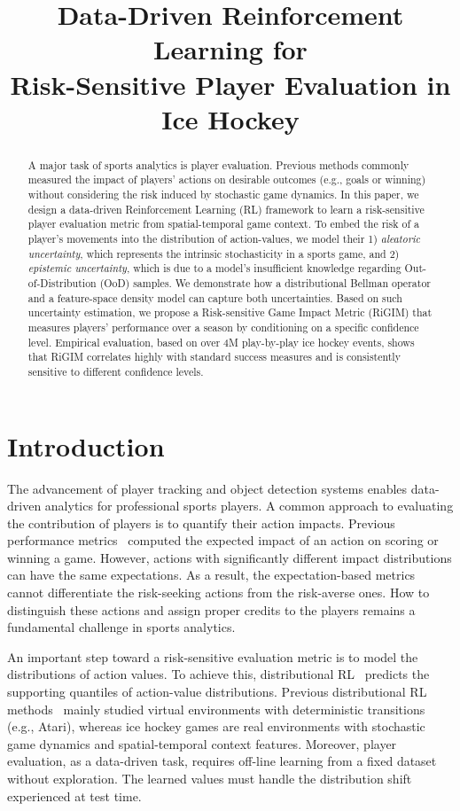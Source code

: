 \documentclass{article}
\title{Data-Driven Reinforcement Learning for \\Risk-Sensitive Player Evaluation in Ice Hockey}
\author{
}
\begin{document}
\maketitle

\begin{abstract}
A major task of sports analytics is player evaluation. Previous methods commonly measured the impact of players' actions on desirable outcomes (e.g., goals or winning) without considering the risk induced by stochastic game dynamics.  In this paper, we design a data-driven Reinforcement Learning (RL) framework to learn a risk-sensitive player evaluation metric from spatial-temporal game context. To embed the risk of a player’s movements into the distribution of action-values, we model their 1) {\it aleatoric uncertainty}, which represents the intrinsic stochasticity in a sports game, and 2) {\it epistemic uncertainty}, which is due to a model's insufficient knowledge regarding Out-of-Distribution (OoD) samples. We demonstrate how a distributional Bellman operator and a feature-space density model can capture both uncertainties. Based on such uncertainty estimation, we propose a Risk-sensitive Game Impact Metric (RiGIM) that measures players' performance over a season by conditioning on a specific confidence level. Empirical evaluation, based on over 4M play-by-play ice hockey events, shows that RiGIM correlates highly with standard success measures and is consistently sensitive to different confidence levels.
\end{abstract}

\section{Introduction}

The advancement of player tracking and object detection systems enables data-driven analytics for professional sports players. A common approach to evaluating the contribution of players is to quantify their action impacts.  Previous performance metrics~\cite{Routley2015Markov,Liu2018DRL,Decroos2019Actions,Luo2020IRL} computed the expected impact of an action on scoring or winning a game. However, actions with significantly different impact distributions can have the same expectations. As a result, the expectation-based metrics cannot differentiate the risk-seeking actions from the risk-averse ones. How to distinguish these actions and assign proper credits to the players remains a fundamental challenge in sports analytics.

An important step toward a risk-sensitive evaluation metric is to model the distributions of action values. To achieve this, distributional RL~\cite{bdr2022} predicts the supporting quantiles of action-value distributions. Previous distributional RL methods~\cite{bellemare2017distributional,Dabney2018DistributionalRL,Mavrin2019DistributionalRL} mainly studied virtual environments with deterministic transitions (e.g., Atari), whereas ice hockey games are real environments with stochastic game dynamics and spatial-temporal context features. Moreover, player evaluation, as a data-driven task, requires off-line learning from a fixed dataset without exploration. The learned values must handle the distribution shift experienced at test time.
\end{document}
